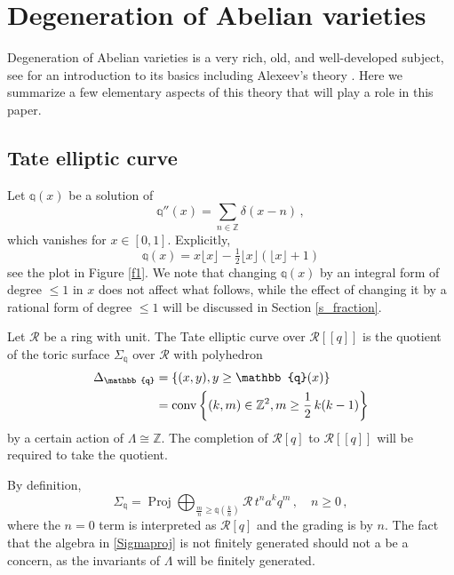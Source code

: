 \documentclass[14pt]{extarticle}
\newcommand{\Z}{\mathbb{Z}}
\newcommand{\cR}{\mathscr{R}}
\newcommand{\Qq}{\mathbb{q}}
\newcommand{\flx}{\lfloor x \rfloor}
\DeclareMathOperator{\Proj}{Proj}
\DeclareMathOperator{\conv}{conv}
\theoremstyle{definition}
\begin{document}
\section{Degeneration of Abelian varieties}

Degeneration of Abelian varieties is a very rich, old, and well-developed
subject, see \cite{Brion} for an introduction to its basics including
Alexeev's theory 
\cite{Alex}. Here we summarize a few elementary aspects of this theory
that will play a role in this paper. 




\subsection{Tate elliptic curve}\label{s_Tate} 


Let $\Qq(x)$ be a solution of
$$
\Qq''(x) = \sum_{n\in \Z} \delta(x-n) \,,
$$
which vanishes for $x\in [0,1]$. Explicitly,
$$
\Qq(x) = x \flx - \tfrac12 \flx (\flx+1)
$$
see the plot in Figure \ref{f1}. We note that changing $\Qq(x)$  by an integral
form of degree $\le 1$ in $x$  does not affect what
follows, while the effect of changing it by a rational form of degree
$\le 1$ will be discussed in Section \ref{s_fraction}.


Let $\cR$ be a ring with unit. The Tate elliptic curve
over $\cR[[q]]$ is the quotient of the toric surface $\Sigma_\Qq$ over
$\cR$ with polyhedron 
%
\begin{align}
\Delta_\Qq &= \{(x,y), y \ge \Qq(x)\}\notag \\
  &= \conv\left\{ (k,m) \in \Z^2, m \ge \frac12 \,
    k(k-1)\right\} \label{DelQq} 
\end{align}
%
by a certain action of $\Lambda \cong \Z$. The completion of $\cR[q]$
to $\cR[[q]]$ will be required to take the quotient. 



By definition, 
%
\begin{equation}
\Sigma_\Qq = \Proj \bigoplus_{\frac{m}{n} \ge
  \Qq\left(\frac{k}{n}\right)}
\cR \, t^n a^k q^m \,, \quad
n\ge 0 \,, \label{Sigmaproj}
\end{equation}
%
where the $n=0$ term is interpreted as $\cR[q]
$ and the
grading is by $n$. The fact that the algebra in \eqref{Sigmaproj} is
not finitely generated should not a be a concern, as the invariants of
$\Lambda$ will be finitely generated.
\end{document}
